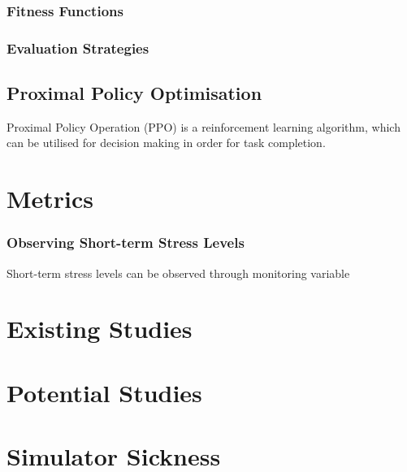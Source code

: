\documentclass{article}
\begin{document}
\subsubsection{Fitness Functions}



\subsubsection{Evaluation Strategies}

\subsection{Proximal Policy Optimisation}

Proximal Policy Operation (PPO) is a reinforcement learning algorithm, which can be utilised for decision making in order for task completion. \cite{schulman2017proximal}

\section{Metrics}

\subsubsection{Observing Short-term Stress Levels}

Short-term stress levels can be observed through monitoring variable 

\section{Existing Studies}


\section{Potential Studies}



\section{Simulator Sickness}



{}
\end{document}
